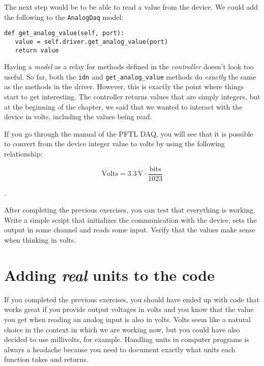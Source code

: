 The next step would be to be able to read a value from the device. We could add the following to the \texttt{AnalogDaq} model:

\begin{verbatim}
def get_analog_value(self, port):
   value = self.driver.get_analog_value(port)
   return value
\end{verbatim}

Having a \emph{model} as a relay for methods defined in the \emph{controller} doesn't look too useful. So far, both the \texttt{idn} and \texttt{get\_analog\_value} methods do \emph{exactly} the same as the methods in the driver. However, this is exactly the point where things start to get interesting. The controller returns values that are simply integers, but at the beginning of the chapter, we said that we wanted to interact with the device in volts, including the values being read. 

If you go through the manual of the {PFTL DAQ}, you will see that it is possible to convert from the device integer value to volts by using the following relationship:

\begin{equation}
 \textrm{Volts} = 3.3\,\textrm{V} \cdot \frac{\textrm{bits}}{1023}
\end{equation}


. 

After completing the previous exercises, you can test that everything is working. Write a simple script that initializes the communication with the device, sets the output in some channel and reads some input. Verify that the values make sense when thinking in volts. 

\section{Adding \emph{real} units to the code}\label{adding-units-to-thecode}
If you completed the previous exercises, you should have ended up with code that works great if you provide output voltages in volts and you know that the value you get when reading an analog input is also in volts. Volts seem like a natural choice in the context in which we are working now, but you could have also decided to use millivolts, for example. Handling units in computer programs is always a headache because you need to document exactly what units each function takes and returns. 

